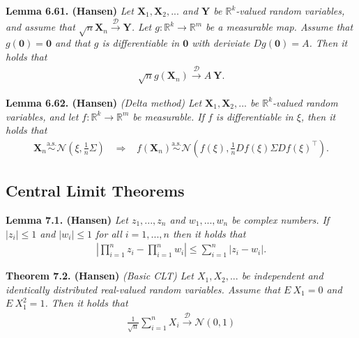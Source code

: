 \documentclass[
]{book}
\begin{document}
\textbf{Lemma 6.61. (Hansen)} \emph{Let \(\mathbf{X}_1,\mathbf{X}_2,...\) and \(\mathbf{Y}\) be \(\mathbb{R}^k\)-valued random variables, and assume that \(\sqrt{n}\mathbf{X}_n\stackrel{\mathcal{D}}{\to} \mathbf{Y}\). Let \(g : \mathbb{R}^k\to \mathbb{R}^m\) be a measurable map. Assume that \(g(\mathbf{0})=\mathbf{0}\) and that \(g\) is differentiable in \(\mathbf{0}\) with deriviate \(Dg(\mathbf{0})=A\). Then it holds that}
\begin{align*}
    \sqrt{n}g(\mathbf{X}_n)\stackrel{\mathcal{D}}{\to} A\ \mathbf{Y}.
\end{align*}

\textbf{Lemma 6.62. (Hansen)} \emph{(Delta method) Let \(\mathbf{X}_1,\mathbf{X}_2,...\) be \(\mathbb{R}^k\)-valued random variables, and let \(f : \mathbb{R}^k\to \mathbb{R}^m\) be measurable. If \(f\) is differentiable in \(\xi\), then it holds that}
\begin{align*}
    \mathbf{X}_n\stackrel{\text{a.s.}}{\sim} \mathcal{N}\left(\xi,\frac{1}{n}\Sigma\right)\hspace{10pt}\Rightarrow\hspace{10pt} f(\mathbf{X}_n)\stackrel{\text{a.s.}}{\sim} \mathcal{N}\left(f(\xi),\frac{1}{n}Df(\xi)\Sigma Df(\xi)^\top\right).
\end{align*}

\hypertarget{central-limit-theorems}{%
\subsection{Central Limit Theorems}\label{central-limit-theorems}}

\textbf{Lemma 7.1. (Hansen)} \emph{Let \(z_1,...,z_n\) and \(w_1,...,w_n\) be complex numbers. If \(\vert z_i\vert \le 1\) and \(\vert w_i\vert\le 1\) for all \(i=1,...,n\) then it holds that}
\begin{align*}
    \left\vert\prod_{i=1}^n z_i-\prod_{i=1}^n w_i\right\vert\le \sum_{i=1}^n \vert z_i-w_i\vert.\tag{7.1 }
\end{align*}

\textbf{Theorem 7.2. (Hansen)} \emph{(Basic CLT) Let \(X_1,X_2,...\) be independent and identically distributed real-valued random variables. Assume that \(E\ X_1=0\) and \(E\ X_1^2=1\). Then it holds that}
\begin{align*}
    \frac{1}{\sqrt{n}}\sum_{i=1}^nX_i\stackrel{\mathcal{D}}{\to} \mathcal{N}(0,1)\tag{7.3}
\end{align*}
\end{document}
